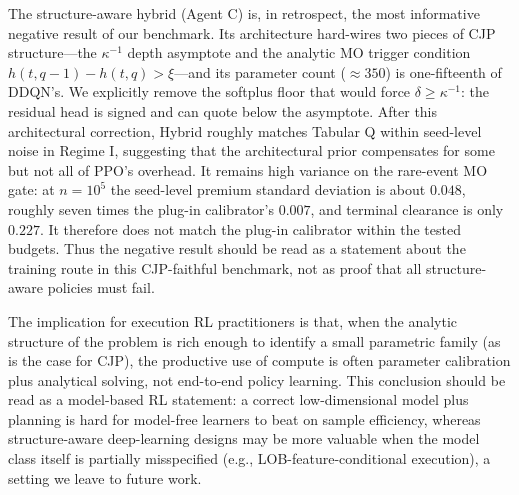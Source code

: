 \documentclass[]{interact}
\theoremstyle{plain}
\theoremstyle{definition}
\theoremstyle{remark}
\newcommand{\1}[1]{\mathbf{1}_{\{#1\}}}
\begin{document}
The structure-aware hybrid (Agent C) is, in retrospect, the most informative negative result of our benchmark. Its architecture hard-wires two pieces of CJP structure---the $\kappa^{-1}$ depth asymptote and the analytic MO trigger condition $h(t,q-1) - h(t,q) > \xi$---and its parameter count ($\approx 350$) is one-fifteenth of DDQN's. We explicitly remove the softplus floor that would force $\delta\ge \kappa^{-1}$: the residual head is signed and can quote below the asymptote. After this architectural correction, Hybrid roughly matches Tabular Q within seed-level noise in Regime I, suggesting that the architectural prior compensates for some but not all of PPO's overhead. It remains high variance on the rare-event MO gate: at $n=10^5$ the seed-level premium standard deviation is about $0.048$, roughly seven times the plug-in calibrator's $0.007$, and terminal clearance is only $0.227$. It therefore does not match the plug-in calibrator within the tested budgets. Thus the negative result should be read as a statement about the training route in this CJP-faithful benchmark, not as proof that all structure-aware policies must fail.

The implication for execution RL practitioners is that, when the analytic structure of the problem is rich enough to identify a small parametric family (as is the case for CJP), the productive use of compute is often parameter calibration plus analytical solving, not end-to-end policy learning. This conclusion should be read as a model-based RL statement: a correct low-dimensional model plus planning is hard for model-free learners to beat on sample efficiency, whereas structure-aware deep-learning designs may be more valuable when the model class itself is partially misspecified (e.g., LOB-feature-conditional execution), a setting we leave to future work.
\end{document}
